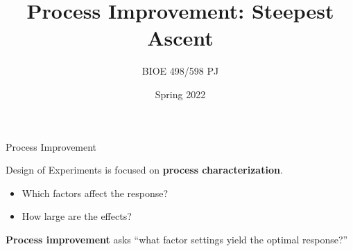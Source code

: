 \documentclass[10pt]{beamer}\usepackage[]{graphicx}\usepackage[]{color}
\title{Process Improvement: Steepest Ascent}
\author{BIOE 498/598 PJ}
\date{Spring 2022}
\begin{document}
\frame{\titlepage}

\begin{frame}{Process Improvement}

Design of Experiments is focused on \textbf{process characterization}.
\begin{itemize}
  \item Which factors affect the response?
  \item How large are the effects?
\end{itemize}

\bigskip
\pause
\textbf{Process improvement} asks ``what factor settings yield the optimal response?''

\begin{center}
\end{center}

\end{frame}
\end{document}
